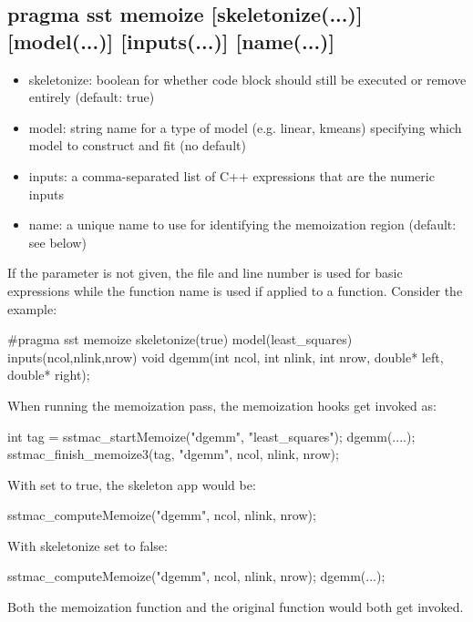 \begin{CppCode}
struct least_squares : public regression model {
 FactoryRegister("least_squares", OperatingSystem::RegressionModel, least_squares)
\end{CppCode}

\subsection{pragma sst memoize [skeletonize(...)] [model(...)] [inputs(...)] [name(...)]}
\begin{itemize}
\item skeletonize: boolean for whether code block should still be executed or remove entirely (default: true)
\item model: string name for a type of model (e.g. linear, kmeans) specifying which model to construct and fit (no default)
\item inputs: a comma-separated list of C++ expressions that are the numeric inputs
\item name: a unique name to use for identifying the memoization region (default: see below)
\end{itemize}
If the  parameter is not given, the file and line number is used for basic expressions while the function name is used if applied to a function.
Consider the example:

\begin{CppCode}
#pragma sst memoize skeletonize(true) model(least_squares) inputs(ncol,nlink,nrow) 
void dgemm(int ncol, int nlink, int nrow, double* left, double* right);
\end{CppCode}
When running the memoization pass, the memoization hooks get invoked as:

\begin{CppCode}
int tag = sstmac_startMemoize("dgemm", "least_squares");
dgemm(....);
sstmac_finish_memoize3(tag, "dgemm", ncol, nlink, nrow);
\end{CppCode}
With  set to true, the skeleton app would be:

\begin{CppCode}
sstmac_computeMemoize("dgemm", ncol, nlink, nrow);
\end{CppCode}
With skeletonize set to false:

\begin{CppCode}
sstmac_computeMemoize("dgemm", ncol, nlink, nrow);
dgemm(...);
\end{CppCode}
Both the memoization function and the original function would both get invoked.

